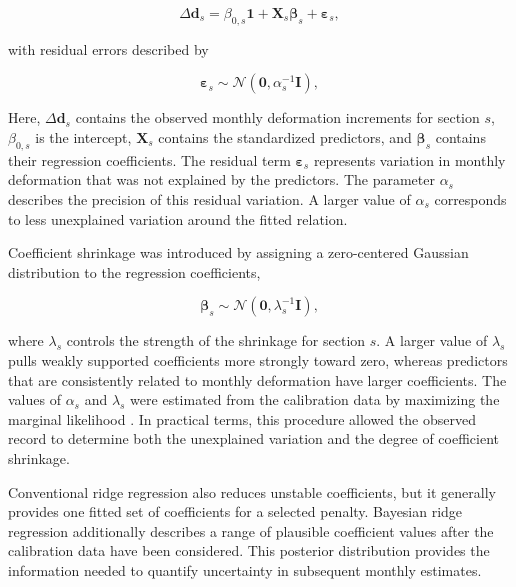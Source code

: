 \begin{equation}
\Delta\boldsymbol{d}_s
=
\beta_{0,s}\boldsymbol{1}
+
\boldsymbol{X}_s\boldsymbol{\beta}_s
+
\boldsymbol{\varepsilon}_s,
\label{eq:brr_regression}
\end{equation}

with residual errors described by

\begin{equation}
\boldsymbol{\varepsilon}_s
\sim
\mathcal{N}
\left(
\boldsymbol{0},
\alpha_s^{-1}\boldsymbol{I}
\right),
\label{eq:brr_likelihood}
\end{equation}

Here, $\Delta\boldsymbol{d}_s$ contains the observed monthly deformation increments for section $s$, $\beta_{0,s}$ is the intercept, $\boldsymbol{X}_s$ contains the standardized predictors, and $\boldsymbol{\beta}_s$ contains their regression coefficients. The residual term $\boldsymbol{\varepsilon}_s$ represents variation in monthly deformation that was not explained by the predictors. The parameter $\alpha_s$ describes the precision of this residual variation. A larger value of $\alpha_s$ corresponds to less unexplained variation around the fitted relation.

Coefficient shrinkage was introduced by assigning a zero-centered Gaussian distribution to the regression coefficients,

\begin{equation}
\boldsymbol{\beta}_s
\sim
\mathcal{N}
\left(
\boldsymbol{0},
\lambda_s^{-1}\boldsymbol{I}
\right),
\label{eq:brr_prior}
\end{equation}

where $\lambda_s$ controls the strength of the shrinkage for section $s$. A larger value of $\lambda_s$ pulls weakly supported coefficients more strongly toward zero, whereas predictors that are consistently related to monthly deformation have larger coefficients. The values of $\alpha_s$ and $\lambda_s$ were estimated from the calibration data by maximizing the marginal likelihood \citep{mackay_bayesian_1992}. In practical terms, this procedure allowed the observed record to determine both the unexplained variation and the degree of coefficient shrinkage.

Conventional ridge regression also reduces unstable coefficients, but it generally provides one fitted set of coefficients for a selected penalty. Bayesian ridge regression additionally describes a range of plausible coefficient values after the calibration data have been considered. This posterior distribution provides the information needed to quantify uncertainty in subsequent monthly estimates.

